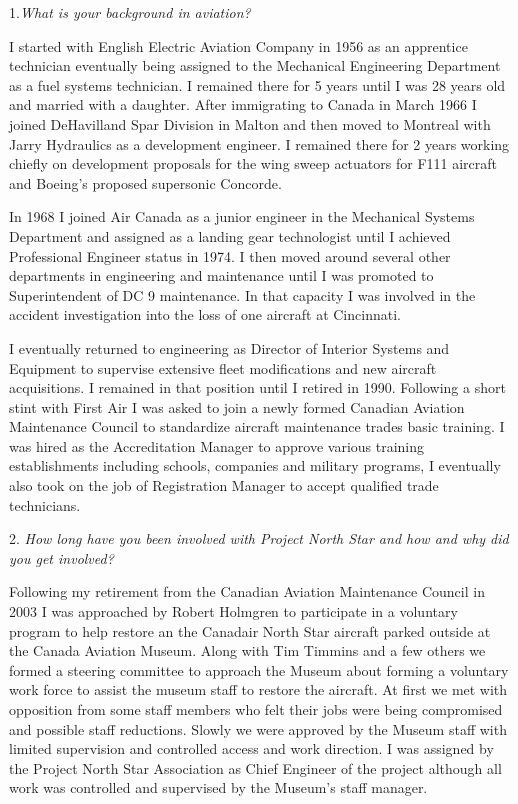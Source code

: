 \begin{multicols}{2}

1.\textit{What is your background in aviation?}

I started with English Electric Aviation Company in 1956 as an
apprentice technician eventually being assigned to the Mechanical
Engineering Department as a fuel systems technician. I remained there
for 5 years until I was 28 years old and married with a daughter. After
immigrating to Canada in March 1966 I joined DeHavilland Spar Division
in Malton and then moved to Montreal with Jarry Hydraulics as a
development engineer. I remained there for 2 years working chiefly on
development proposals for the wing sweep actuators for F111 aircraft
and Boeing's proposed supersonic Concorde.

In 1968 I joined Air Canada as a junior engineer in the Mechanical
Systems Department and assigned as a landing gear technologist until I
achieved Professional Engineer status in 1974. I then moved around
several other departments in engineering and maintenance until I was
promoted to Superintendent of DC 9 maintenance. In that capacity I was
involved in the accident investigation into the loss of one aircraft at
Cincinnati.

I eventually returned to engineering as Director of Interior Systems and
Equipment to supervise extensive fleet modifications and new aircraft
acquisitions. I remained in that position until I retired in 1990.
Following a short stint with First Air I was asked to join a newly formed
Canadian Aviation Maintenance Council to standardize aircraft
maintenance trades basic training. I was hired as the Accreditation
Manager to approve various training establishments including schools,
companies and military programs, I eventually also took on the job of
Registration Manager to accept qualified trade technicians.

2. \textit{How long have you been involved with Project North Star and how and why did you get involved?}

Following my retirement from the Canadian Aviation Maintenance
Council in 2003 I was approached by Robert Holmgren to participate in
a voluntary program to help restore an the Canadair North Star aircraft
parked outside at the Canada Aviation Museum. Along with Tim
Timmins and a few others we formed a steering committee to approach
the Museum about forming a voluntary work force to assist the museum
staff to restore the aircraft. At first we met with opposition from some
staff members who felt their jobs were being compromised and possible
staff reductions. Slowly we were approved by the Museum staff with
limited supervision and controlled access and work direction. I was
assigned by the Project North Star Association as Chief Engineer of the
project although all work was controlled and supervised by the
Museum's staff manager.


\end{multicols}
